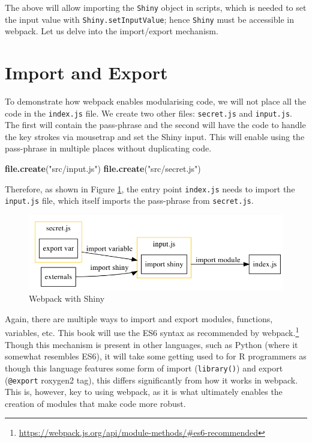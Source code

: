 \documentclass[10pt,]{krantz}
\makeatletter
\newenvironment{Shaded}{\begin{snugshade}}{\end{snugshade}}
\newcommand{\KeywordTok}[1]{\textcolor[rgb]{0.27,0.27,0.27}{\textbf{#1}}}
\newcommand{\NormalTok}[1]{#1}
\newcommand{\StringTok}[1]{\textcolor[rgb]{0.5,0.5,0.5}{#1}}
\renewcommand{\href}[2]{#2\footnote{\url{#1}}}
\newenvironment{kframe}{%
\medskip{}
\setlength{\fboxsep}{.8em}
 \def\at@end@of@kframe{}%
 \ifinner\ifhmode%
  \def\at@end@of@kframe{\end{minipage}}%
  \begin{minipage}{\columnwidth}%
 \fi\fi%
 \def\FrameCommand##1{\hskip\@totalleftmargin \hskip-\fboxsep
 \colorbox{shadecolor}{##1}\hskip-\fboxsep
     \hskip-\linewidth \hskip-\@totalleftmargin \hskip\columnwidth}%
 \MakeFramed {\advance\hsize-\width
   \@totalleftmargin\z@ \linewidth\hsize
   \@setminipage}}%
 {\par\unskip\endMakeFramed%
 \at@end@of@kframe}
\renewenvironment{Shaded}{\begin{kframe}}{\end{kframe}}
\makeatother
\begin{document}
The above will allow importing the \texttt{Shiny} object in scripts, which is needed to set the input value with \texttt{Shiny.setInputValue}; hence \texttt{Shiny} must be accessible in webpack. Let us delve into the import/export mechanism.

\hypertarget{webpack-intro-import-export}{%
\section{Import and Export}\label{webpack-intro-import-export}}

To demonstrate how webpack enables modularising code, we will not place all the code in the \texttt{index.js} file. We create two other files: \texttt{secret.js} and \texttt{input.js}. The first will contain the pass-phrase and the second will have the code to handle the key strokes via mousetrap and set the Shiny input. This will enable using the pass-phrase in multiple places without duplicating code.

\begin{Shaded}
\begin{Highlighting}[]
\KeywordTok{file.create}\NormalTok{(}\StringTok{"src/input.js"}\NormalTok{)}
\KeywordTok{file.create}\NormalTok{(}\StringTok{"src/secret.js"}\NormalTok{)}
\end{Highlighting}
\end{Shaded}

Therefore, as shown in Figure \ref{fig:webpack-shiny}, the entry point \texttt{index.js} needs to import the \texttt{input.js} file, which itself imports the pass-phrase from \texttt{secret.js}.

\begin{figure}[H]

{\centering \includegraphics[width=1\linewidth]{images/07-webpack-shiny} 

}

\caption{Webpack with Shiny}\label{fig:webpack-shiny}
\end{figure}

Again, there are multiple ways to import and export modules, functions, variables, etc. This book will use the ES6 syntax as \href{https://webpack.js.org/api/module-methods/\#es6-recommended}{recommended by webpack.} Though this mechanism is present in other languages, such as Python (where it somewhat resembles ES6), it will take some getting used to for R programmers as though this language features some form of import (\texttt{library()}) and export (\texttt{@export} roxygen2 tag), this differs significantly from how it works in webpack. This is, however, key to using webpack, as it is what ultimately enables the creation of modules that make code more robust.
\end{document}
